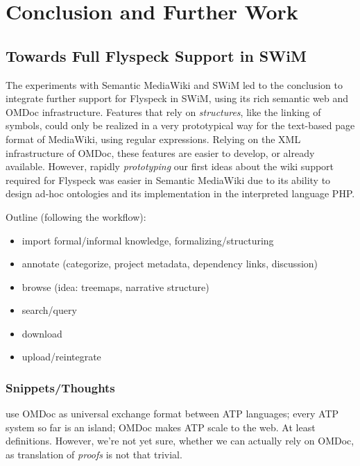 
\section{Conclusion and Further Work}
\label{sec:conc}

\subsection{Towards Full Flyspeck Support in SWiM}
\label{sec:flyspeck-swim}

The experiments with Semantic MediaWiki and SWiM led to the conclusion to integrate
further support for Flyspeck in SWiM, using its rich semantic web and OMDoc
infrastructure.  Features that rely on \emph{structures}, like the linking of symbols,
could only be realized in a very prototypical way for the text-based page format of
MediaWiki, using regular expressions.  Relying on the XML infrastructure of OMDoc, these
features are easier to develop, or already available.  However, rapidly \emph{prototyping}
our first ideas about the wiki support required for Flyspeck was easier in Semantic
MediaWiki due to its ability to design ad-hoc ontologies and its implementation in the
interpreted language PHP.

Outline (following the workflow):
\begin{itemize}
\item import formal/informal knowledge, formalizing/structuring
\item annotate (categorize, project metadata, dependency links, discussion)
\item browse (idea: treemaps, narrative structure)
\item search/query
\item download
\item upload/reintegrate
\end{itemize}

\subsubsection{Snippets/Thoughts}

use OMDoc as universal exchange format between ATP languages; every ATP system so far is
an island; OMDoc makes ATP scale to the web.  At least definitions.  However, we're not
yet sure, whether we can actually rely on OMDoc, as translation
of \emph{proofs} is not that trivial.


